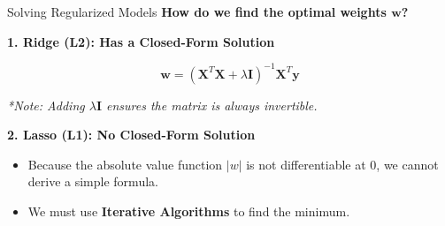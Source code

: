 \begin{frame}{Solving Regularized Models}
    \textbf{How do we find the optimal weights $\mathbf{w}$?}

    \vspace{1em}
    \textbf{1. Ridge (L2): Has a Closed-Form Solution}
    \begin{tcolorbox}[colback=blue!5, colframe=blue!60!black, title=\textbf{Ridge Normal Equation}]
        $$ \mathbf{w} = (\mathbf{X}^T\mathbf{X} + \lambda \mathbf{I})^{-1} \mathbf{X}^T\mathbf{y} $$
    \end{tcolorbox}
    \small
    \textit{*Note: Adding $\lambda \mathbf{I}$ ensures the matrix is always invertible.}

    \vspace{1.5em}
    \textbf{2. Lasso (L1): No Closed-Form Solution}
    \begin{itemize}
        \item Because the absolute value function $|w|$ is not differentiable at 0, we cannot derive a simple formula.
        \item We must use \textbf{Iterative Algorithms} to find the minimum.
    \end{itemize}
\end{frame}

